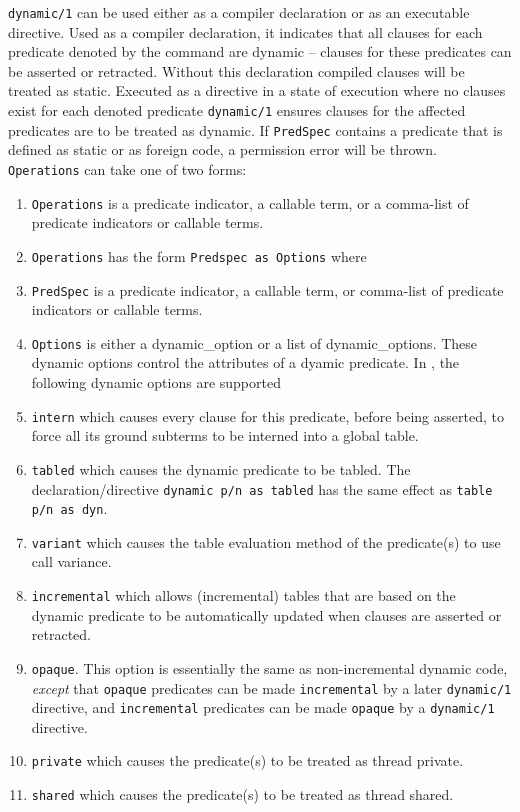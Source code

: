 \begin{description}
\label{dynamic-declaration}
\label{dynamic/1}
%
{\tt dynamic/1} can be used either as a compiler declaration or as an
executable directive.  Used as a compiler declaration, it indicates
that all clauses for each predicate denoted by the command are dynamic
-- clauses for these predicates can be asserted or retracted.  Without
this declaration compiled clauses will be treated as static.  Executed
as a directive in a state of execution where no clauses exist for each
denoted predicate {\tt dynamic/1} ensures clauses for the affected
predicates are to be treated as dynamic. If {\tt PredSpec} contains a
predicate that is defined as static or as foreign code, a permission
error will be thrown.  {\tt Operations} can take one of two forms:
%

\begin{enumerate}
\item {\tt Operations} is a predicate indicator, a callable term, or a
  comma-list of predicate indicators or callable terms.
%
\item {\tt Operations} has the form {\tt Predspec as Options} where
\bi
\item {\tt PredSpec} is a predicate indicator, a callable term, or
  comma-list of predicate indicators or callable terms.
%
\item {\tt Options} is either a dynamic\_option or a list of
  dynamic\_options.  These dynamic options control the attributes of a
  dyamic predicate.  In \version, the following dynamic options are
  supported 
%
\bi
\item{\tt intern} which causes every clause for this predicate, before 
being asserted, to force all its ground subterms to be interned into a 
global table.
%
\item{\tt tabled} which causes the dynamic predicate to be tabled.
  The declaration/directive {\tt dynamic p/n as tabled} has the same
  effect as {\tt table p/n as dyn}.
%
\item {\tt variant} which causes the table evaluation method of the
  predicate(s) to use call variance.
%
%
\item {\tt incremental} which allows (incremental) tables that are
  based on the dynamic predicate to be automatically updated when
  clauses are asserted or retracted.
%
\item {\tt opaque}. This option is essentially the same as
  non-incremental dynamic code, {\em except} that {\tt opaque}
  predicates can be made {\tt incremental} by a later {\tt dynamic/1}
  directive, and {\tt incremental} predicates can be made {\tt opaque}
  by a {\tt dynamic/1} directive.
%
\item {\tt private} which causes the predicate(s) to be treated as
  thread private.
%
\item {\tt shared} which causes the predicate(s) to be treated as
  thread shared.
\ei
\ei
\end{enumerate}


\end{description}
